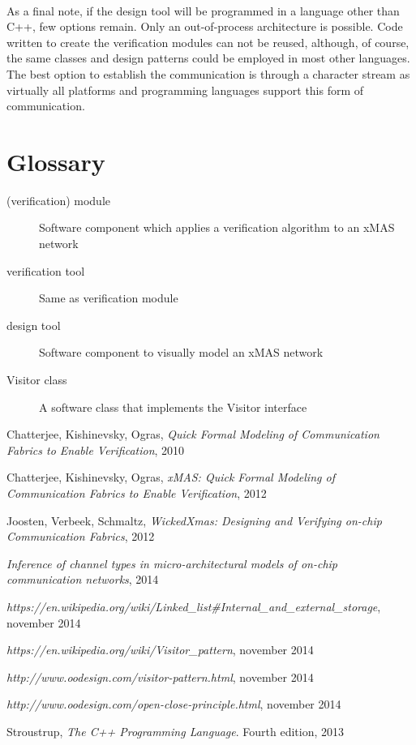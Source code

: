 \documentclass[a4paper,11pt]{article}
\begin{document}
\paragraph{}
As a final note, if the design tool will be programmed in a language other than
C++, few options remain. Only an out-of-process architecture is possible. Code
written to create the verification modules can not be reused, although, of course,
the same classes and design patterns could be employed in most other languages.
The best option to establish the communication is through a character stream as
virtually all platforms and programming languages support this form of
communication.

\newpage

\section{Glossary}
\begin{description}
 \item[(verification) module] 	Software component which applies a verification algorithm to an xMAS network
 \item[verification tool]	Same as verification module
 \item[design tool]		Software component to visually model an xMAS network
 \item[Visitor class]		A software class that implements the Visitor interface
\end{description}

\begin{thebibliography}{9}

  Chatterjee, Kishinevsky, Ogras,
  \emph{Quick Formal Modeling of Communication Fabrics to Enable Verification},
  2010
  
  Chatterjee, Kishinevsky, Ogras,
  \emph{xMAS: Quick Formal Modeling of Communication Fabrics to Enable Verification},
  2012
  
  Joosten, Verbeek, Schmaltz,
  \emph{WickedXmas: Designing and Verifying on-chip Communication Fabrics},
  2012
  
  \emph{Inference of channel types in micro-architectural models of on-chip communication networks},
  2014
  
  \emph{https://en.wikipedia.org/wiki/Linked\_list\#Internal\_and\_external\_storage},
  november 2014
  
  \emph{https://en.wikipedia.org/wiki/Visitor\_pattern},
  november 2014

  \emph{http://www.oodesign.com/visitor-pattern.html},
  november 2014
  
  \emph{http://www.oodesign.com/open-close-principle.html},
  november 2014
  
  Stroustrup,
  \emph{The C++ Programming Language}.
  Fourth edition,
  2013
  
  
  
\end{thebibliography}
\end{document}
